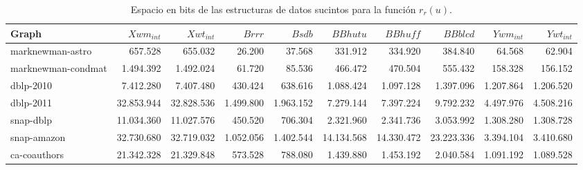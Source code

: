 \begin{table}
    \caption{Espacio en bits de las estructuras de datos sucintos para la función $r_{r}(u)$.}
    \label{table:sdslBitsRr}
    \centering
    \scriptsize
    \begin{tabular}{l|r|r|r|r|r|r|r|r|r}
        \toprule
        Graph & $X wm_{int}$ & $X wt_{int}$ & $B rrr$ & $B sdb$ & $BB hutu$ & $BB huff$ & $BB blcd$ & $Y wm_{int}$ & $Y wt_{int}$ \\
        \midrule
        marknewman-astro & 657.528 & 655.032 & 26.200 & 37.568 & 331.912 & 334.920 & 384.840 & 64.568 & 62.904 \\
        marknewman-condmat & 1.494.392 & 1.492.024 & 61.720 & 85.536 & 466.472 & 470.504 & 555.432 & 158.328 & 156.152 \\
        dblp-2010 & 7.412.280 & 7.407.480 & 430.424 & 638.616 & 1.088.424 & 1.097.128 & 1.397.096 & 1.207.864 & 1.206.520 \\
        dblp-2011 & 32.853.944 & 32.828.536 & 1.499.800 & 1.963.152 & 7.279.144 & 7.397.224 & 9.792.232 & 4.497.976 & 4.508.216 \\
        snap-dblp & 11.034.360 & 11.027.576 & 450.520 & 706.304 & 2.321.960 & 2.341.736 & 3.053.992 & 1.308.280 & 1.308.728 \\
        snap-amazon & 32.730.680 & 32.719.032 & 1.052.056 & 1.402.544 & 14.134.568 & 14.330.472 & 23.223.336 & 3.394.104 & 3.410.680 \\
        ca-coauthors & 21.342.328 & 21.329.848 & 573.528 & 788.080 & 1.439.880 & 1.453.192 & 2.040.584 & 1.091.192 & 1.089.528 \\
        \bottomrule
    \end{tabular}
\end{table}

